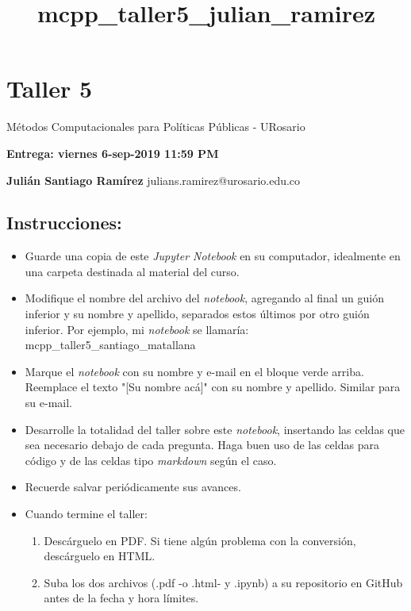 \documentclass[11pt]{article}
\title{mcpp\_taller5\_julian\_ramirez}
\providecommand{\tightlist}{%
      \setlength{\itemsep}{0pt}\setlength{\parskip}{0pt}}
\begin{document}
    
    
    \maketitle
    
    

    
    \section{Taller 5}\label{taller-5}

Métodos Computacionales para Políticas Públicas - URosario

\textbf{Entrega: viernes 6-sep-2019 11:59 PM}

    \textbf{Julián Santiago Ramírez} julians.ramirez@urosario.edu.co

    \subsection{Instrucciones:}\label{instrucciones}

\begin{itemize}
\tightlist
\item
  Guarde una copia de este \emph{Jupyter Notebook} en su computador,
  idealmente en una carpeta destinada al material del curso.
\item
  Modifique el nombre del archivo del \emph{notebook}, agregando al
  final un guión inferior y su nombre y apellido, separados estos
  últimos por otro guión inferior. Por ejemplo, mi \emph{notebook} se
  llamaría: mcpp\_taller5\_santiago\_matallana
\item
  Marque el \emph{notebook} con su nombre y e-mail en el bloque verde
  arriba. Reemplace el texto "{[}Su nombre acá{]}" con su nombre y
  apellido. Similar para su e-mail.
\item
  Desarrolle la totalidad del taller sobre este \emph{notebook},
  insertando las celdas que sea necesario debajo de cada pregunta. Haga
  buen uso de las celdas para código y de las celdas tipo
  \emph{markdown} según el caso.
\item
  Recuerde salvar periódicamente sus avances.
\item
  Cuando termine el taller:

  \begin{enumerate}
  \def\labelenumi{\arabic{enumi}.}
  \tightlist
  \item
    Descárguelo en PDF. Si tiene algún problema con la conversión,
    descárguelo en HTML.
  \item
    Suba los dos archivos (.pdf -o .html- y .ipynb) a su repositorio en
    GitHub antes de la fecha y hora límites.
  \end{enumerate}
\end{itemize}
\end{document}
